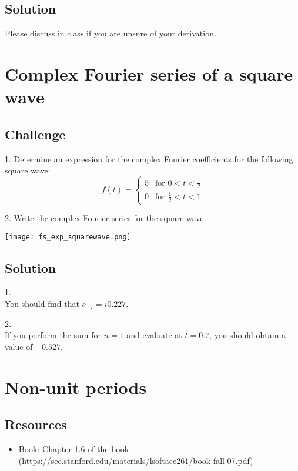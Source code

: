 \subsection*{Solution}
Please discuss in class if you are unsure of your derivation.




\newpage
\section{Complex Fourier series of a square wave}

\subsection*{Challenge}
1. Determine an expression for the complex Fourier coefficients for the following square wave:
\begin{equation}
   f(t) =
   \begin{cases}
       5 & \text{for } 0 < t < \frac{1}{2} \\
       0 & \text{for } \frac{1}{2} < t < 1
   \end{cases} 
\end{equation}

2. Write the complex Fourier series for the square wave.

\texttt{[image: fs\_exp\_squarewave.png]}

\subsection*{Solution}
1.\\
You should find that $c_{-7} = i 0.227$.

2.\\
If you perform the sum for $n=1$ and evaluate at $t=0.7$, you should obtain a value of $-0.527$.




\newpage
\section{Non-unit periods}

\subsection*{Resources}
\begin{itemize}
    \item Book: Chapter 1.6 of the book (\url{https://see.stanford.edu/materials/lsoftaee261/book-fall-07.pdf})
\end{itemize}

